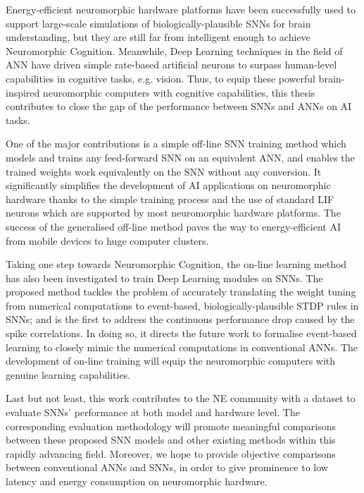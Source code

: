 
Energy-efficient neuromorphic hardware platforms have been successfully used to support large-scale simulations of biologically-plausible SNNs for brain understanding, but they are still far from intelligent enough to achieve Neuromorphic Cognition.
Meanwhile, Deep Learning techniques in the field of ANN have driven simple rate-based artificial neurons to surpass human-level capabilities in cognitive tasks, e.g. vision.
Thus, to equip these powerful brain-inspired neuromorphic computers with cognitive capabilities, this thesis contributes to close the gap of the performance between SNNs and ANNs on AI tasks.

One of the major contributions is a simple off-line SNN training method which models and trains any feed-forward SNN on an equivalent ANN, and enables the trained weights work equivalently on the SNN without any conversion.
It significantly simplifies the development of AI applications on neuromorphic hardware thanks to the simple training process and the use of standard LIF neurons which are supported by most neuromorphic hardware platforms.
The success of the generalised off-line method paves the way to energy-efficient AI from mobile devices to huge computer clusters.


Taking one step towards Neuromorphic Cognition, the on-line learning method has also been investigated to train Deep Learning modules on SNNs.
The proposed method tackles the problem of accurately translating the weight tuning from numerical computations to event-based, biologically-plausible STDP rules in SNNs;
and is the first to address the continuous performance drop caused by the spike correlations.
In doing so, it directs the future work to formalise event-based learning to closely mimic the numerical computations in conventional ANNs.
The development of on-line training will equip the neuromorphic computers with genuine learning capabilities.

Last but not least, this work contributes to the NE community with a \DIFdelbegin {}\DIFdelend \DIFaddbegin {}\DIFaddend dataset to evaluate SNNs' performance at both model and hardware level.
The corresponding evaluation methodology will promote meaningful comparisons between these proposed SNN models and other existing methods within this rapidly advancing field.
Moreover, we hope to provide objective comparisons between conventional ANNs and SNNs, in order to give prominence to low latency and energy consumption on neuromorphic hardware.

